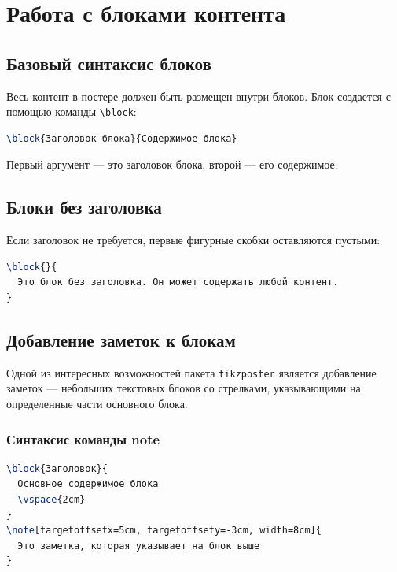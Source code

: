 \documentclass[12pt,a4paper]{article}
\begin{document}
\section{Работа с блоками контента}

\subsection{Базовый синтаксис блоков}

Весь контент в постере должен быть размещен внутри блоков. Блок создается с помощью команды \texttt{\textbackslash block}:

\begin{lstlisting}[language=TeX]
\block{Заголовок блока}{Содержимое блока}
\end{lstlisting}

Первый аргумент — это заголовок блока, второй — его содержимое.

\subsection{Блоки без заголовка}

Если заголовок не требуется, первые фигурные скобки оставляются пустыми:

\begin{lstlisting}[language=TeX]
\block{}{
  Это блок без заголовка. Он может содержать любой контент.
}
\end{lstlisting}

\subsection{Добавление заметок к блокам}

Одной из интересных возможностей пакета \texttt{tikzposter} является добавление заметок — небольших текстовых блоков со стрелками, указывающими на определенные части основного блока.

\subsubsection{Синтаксис команды note}

\begin{lstlisting}[language=TeX]
\block{Заголовок}{
  Основное содержимое блока
  \vspace{2cm}
}
\note[targetoffsetx=5cm, targetoffsety=-3cm, width=8cm]{
  Это заметка, которая указывает на блок выше
}
\end{lstlisting}
\end{document}
